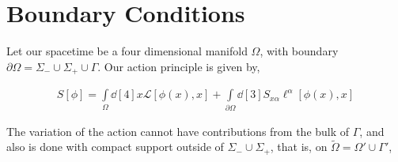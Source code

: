 \section{Boundary Conditions}

Let our spacetime be a four dimensional manifold $\Omega$, with boundary $\partial\Omega = \Sigma_-\cup\Sigma_+\cup\Gamma$. 
Our action principle is given by,

\begin{align}
    S[\phi] = \int\limits_\Omega\dd[4]{x}\mathcal L[\phi(x),x]+\int\limits_{\partial\Omega}\dd[3]{S_{x\alpha}}\ell^\alpha[\phi(x),x]
\end{align}

The variation of the action cannot have contributions from the bulk of $\Gamma$, and also is done with compact support 
outside of $\Sigma_-\cup\Sigma_+$, that is, on $\tilde\Omega = \Omega'\cup\Gamma'$,

